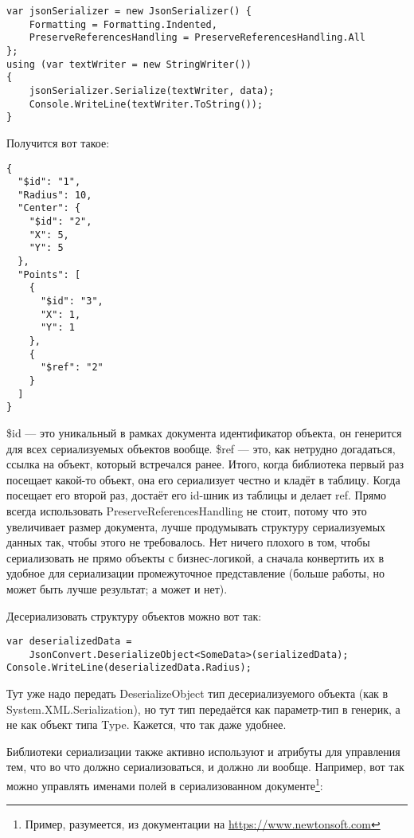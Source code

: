 \documentclass{../../text-style}
\begin{document}
\begin{verbatim}
var jsonSerializer = new JsonSerializer() {
    Formatting = Formatting.Indented,
    PreserveReferencesHandling = PreserveReferencesHandling.All
};
using (var textWriter = new StringWriter())
{
    jsonSerializer.Serialize(textWriter, data);
    Console.WriteLine(textWriter.ToString());
}
\end{verbatim}

Получится вот такое:

\begin{verbatim}
{
  "$id": "1",
  "Radius": 10,
  "Center": {
    "$id": "2",
    "X": 5,
    "Y": 5
  },
  "Points": [
    {
      "$id": "3",
      "X": 1,
      "Y": 1
    },
    {
      "$ref": "2"
    }
  ]
}
 \end{verbatim}

\$id --- это уникальный в рамках документа идентификатор объекта, он генерится для всех сериализуемых объектов вообще. \$ref --- это, как нетрудно догадаться, ссылка на объект, который встречался ранее. Итого, когда библиотека первый раз посещает какой-то объект, она его сериализует честно и кладёт в таблицу. Когда посещает его второй раз, достаёт его id-шник из таблицы и делает ref. Прямо всегда использовать PreserveReferencesHandling не стоит, потому что это увеличивает размер документа, лучше продумывать структуру сериализуемых данных так, чтобы этого не требовалось. Нет ничего плохого в том, чтобы сериализовать не прямо объекты с бизнес-логикой, а сначала конвертить их в удобное для сериализации промежуточное представление (больше работы, но может быть лучше результат; а может и нет).

Десериализовать структуру объектов можно  вот так:

\begin{verbatim}
var deserializedData = 
    JsonConvert.DeserializeObject<SomeData>(serializedData);
Console.WriteLine(deserializedData.Radius);
\end{verbatim}

Тут уже надо передать DeserializeObject тип десериализуемого объекта (как в System.XML.Serialization), но тут тип передаётся как параметр-тип в генерик, а не как объект типа Type. Кажется, что так даже удобнее.

Библиотеки сериализации также активно используют и атрибуты для управления тем, что во что должно сериализоваться, и должно ли вообще. Например, вот так можно управлять именами полей в сериализованном документе\footnote{Пример, разумеется, из документации на \url{https://www.newtonsoft.com}}:
\end{document}
